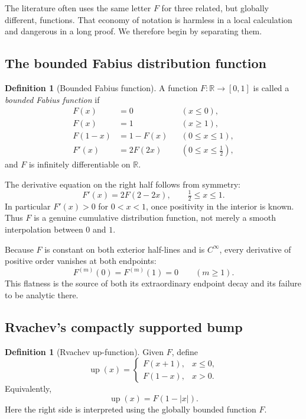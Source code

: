 \documentclass[11pt,oneside]{article}
\theoremstyle{definition}
\newtheorem{definition}[theorem]{Definition}
\theoremstyle{remark}
\newcommand{\R}{\mathbb R}
\newcommand{\Up}{\operatorname{up}}
\begin{document}
The literature often uses the same letter $F$ for three related, but globally different,
functions.  That economy of notation is harmless in a local calculation and dangerous in a
long proof.  We therefore begin by separating them.

\subsection{The bounded Fabius distribution function}

\begin{definition}[Bounded Fabius function]
A function $F:\R\to[0,1]$ is called a \emph{bounded Fabius function} if
\begin{align}
 F(x)&=0 &&(x\le 0), \label{eq:F-left}\\
 F(x)&=1 &&(x\ge 1), \label{eq:F-right}\\
 F(1-x)&=1-F(x) &&(0\le x\le 1), \label{eq:F-symmetry}\\
 F'(x)&=2F(2x) &&(0\le x\le \tfrac12), \label{eq:F-diffeq}
\end{align}
and $F$ is infinitely differentiable on $\R$.
\end{definition}

The derivative equation on the right half follows from symmetry:
\begin{equation}
 F'(x)=2F(2-2x),\qquad \tfrac12\le x\le 1.                 \label{eq:F-diffeq-right}
\end{equation}
In particular $F'(x)>0$ for $0<x<1$, once positivity in the interior is known.  Thus $F$
is a genuine cumulative distribution function, not merely a smooth interpolation between
$0$ and $1$.

Because $F$ is constant on both exterior half-lines and is $C^\infty$, every derivative of
positive order vanishes at both endpoints:
\begin{equation}
 F^{(m)}(0)=F^{(m)}(1)=0\qquad(m\ge1).                    \label{eq:flat-endpoints}
\end{equation}
This flatness is the source of both its extraordinary endpoint decay and its failure to be
analytic there.

\subsection{Rvachev's compactly supported bump}

\begin{definition}[Rvachev up-function]
Given $F$, define
\begin{equation}
 \Up(x)=
 \begin{cases}
   F(x+1),&x\le0,\\
   F(1-x),&x>0.
 \end{cases}                                               \label{eq:up-fold}
\end{equation}
Equivalently,
\begin{equation}
 \Up(x)=F(1-|x|).                                          \label{eq:up-absolute}
\end{equation}
Here the right side is interpreted using the globally bounded function $F$.
\end{definition}
\end{document}
